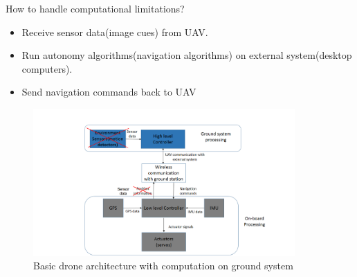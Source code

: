 \documentclass[8pt]{beamer}
\begin{document}
\begin{frame}{How to handle computational limitations?}
\begin{itemize}
 \setlength\itemsep{1em}
     \item {Receive sensor data(image cues) from UAV.}
     \item {Run autonomy algorithms(navigation algorithms) on external system(desktop computers).}
     \item {Send navigation commands back to UAV}
    \end{itemize}
 \begin{figure}[h]
  \centering
\includegraphics[width=10cm]{images/basic_acrh2_2.PNG}%
\caption{Basic drone architecture with computation on ground system}%
  \label{fig:drone_ground_communication}
\end{figure}
  
\end{frame}
\end{document}
